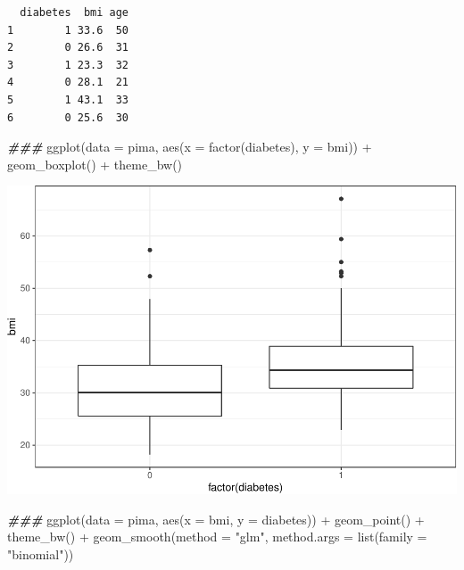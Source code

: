 \documentclass[
]{article}
\newenvironment{Shaded}{\begin{snugshade}}{\end{snugshade}}
\newcommand{\AttributeTok}[1]{\textcolor[rgb]{0.77,0.63,0.00}{#1}}
\newcommand{\DocumentationTok}[1]{\textcolor[rgb]{0.56,0.35,0.01}{\textbf{\textit{#1}}}}
\newcommand{\FunctionTok}[1]{\textcolor[rgb]{0.00,0.00,0.00}{#1}}
\newcommand{\NormalTok}[1]{#1}
\newcommand{\SpecialCharTok}[1]{\textcolor[rgb]{0.00,0.00,0.00}{#1}}
\newcommand{\StringTok}[1]{\textcolor[rgb]{0.31,0.60,0.02}{#1}}
\begin{document}
\begin{verbatim}
  diabetes  bmi age
1        1 33.6  50
2        0 26.6  31
3        1 23.3  32
4        0 28.1  21
5        1 43.1  33
6        0 25.6  30
\end{verbatim}

\begin{Shaded}
\begin{Highlighting}[]
\DocumentationTok{\#\#\#}
\FunctionTok{ggplot}\NormalTok{(}\AttributeTok{data =}\NormalTok{ pima, }\FunctionTok{aes}\NormalTok{(}\AttributeTok{x =} \FunctionTok{factor}\NormalTok{(diabetes), }\AttributeTok{y =}\NormalTok{ bmi)) }\SpecialCharTok{+} 
  \FunctionTok{geom\_boxplot}\NormalTok{() }\SpecialCharTok{+} 
  \FunctionTok{theme\_bw}\NormalTok{()}
\end{Highlighting}
\end{Shaded}

\begin{center}\includegraphics{CHAP23_files/figure-latex/unnamed-chunk-12-1} \end{center}

\begin{Shaded}
\begin{Highlighting}[]
\DocumentationTok{\#\#\#}
\FunctionTok{ggplot}\NormalTok{(}\AttributeTok{data =}\NormalTok{ pima, }\FunctionTok{aes}\NormalTok{(}\AttributeTok{x =}\NormalTok{ bmi, }\AttributeTok{y =}\NormalTok{ diabetes)) }\SpecialCharTok{+} 
  \FunctionTok{geom\_point}\NormalTok{() }\SpecialCharTok{+}
  \FunctionTok{theme\_bw}\NormalTok{() }\SpecialCharTok{+} 
  \FunctionTok{geom\_smooth}\NormalTok{(}\AttributeTok{method =} \StringTok{"glm"}\NormalTok{, }\AttributeTok{method.args =} \FunctionTok{list}\NormalTok{(}\AttributeTok{family =} \StringTok{"binomial"}\NormalTok{))}
\end{Highlighting}
\end{Shaded}
\end{document}

